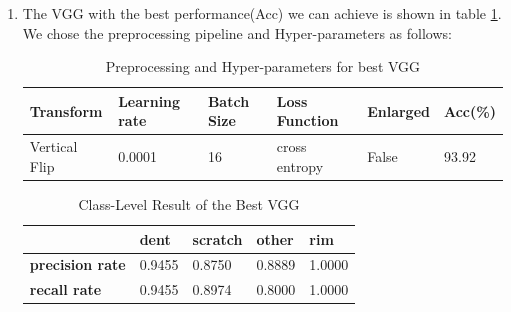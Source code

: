 \documentclass[lang=english,inputenc=utf8,fontsize=10pt]{ldvarticle}
\begin{document}
\begin{enumerate}[label=\alph*)]
\begin{table}[H]
\begin{center}
\begin{tabular}{|m{2cm}<{\centering}|m{2cm}<{\centering}|m{2.0cm}<{\centering}|m{2cm}<{\centering}|m{2cm}<{\centering}|}
        \end{tabular}   
        \end{center}   
    \end{table}
    \item
    The VGG with the best performance(Acc) we can achieve is shown in table \ref{Preprocessing and Hyperparameters for best VGG}. We chose the preprocessing pipeline and Hyper-parameters as follows:\\
    \begin{table}[H] 
        \begin{center}  
            \caption{Preprocessing and Hyper-parameters for best VGG}  
            \label{Preprocessing and Hyperparameters for best VGG}
            \begin{tabular}{|m{2cm}<{\centering}|m{2cm}<{\centering}|m{2cm}<{\centering}|m{2cm}<{\centering}|m{2cm}<{\centering}|m{2cm}<{\centering}|}   
            \hline   \textbf{Transform} & \textbf{Learning rate}& \textbf{Batch Size} & \textbf{Loss Function} & \textbf{Enlarged} & \textbf{Acc(\%)} \\   
            \hline   Vertical Flip & 0.0001 & 16 & cross entropy & False & 93.92 \\  
            \hline   
            \end{tabular}   
        \end{center}  
    \end{table}
        \begin{table}[htb]   
        \begin{center}   
        \caption{Class-Level Result of the Best VGG}  
        \label{VGG performance} 
        \begin{tabular}{|m{2cm}<{\centering}|m{2cm}<{\centering}|m{2.0cm}<{\centering}|m{2cm}<{\centering}|m{2cm}<{\centering}|}   
        \hline   &\textbf{dent} & \textbf{scratch} & \textbf{other} & \textbf{rim}\\ 
        \hline   \textbf{precision rate}  & 0.9455 & 0.8750 & 0.8889 & 1.0000  \\ 
        \hline   \textbf{recall rate} & 0.9455 & 0.8974 & 0.8000 & 1.0000   \\  
        \hline 
        \end{tabular}   
        \end{center}   
    \end{table}
\end{enumerate}
\end{document}
